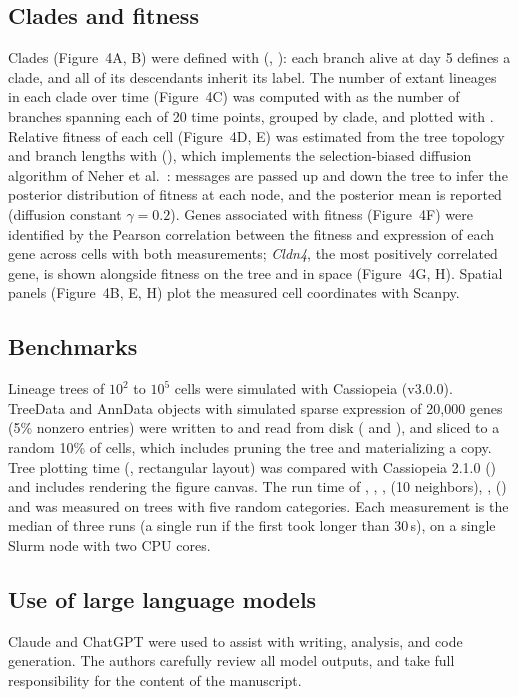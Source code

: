 \subsection*{Clades and fitness}
Clades (Figure~4A, B) were defined with  (, ): each branch alive at day 5 defines a clade, and all of its descendants inherit its label. The number of extant lineages in each clade over time (Figure~4C) was computed with  as the number of branches spanning each of 20 time points, grouped by clade, and plotted with . Relative fitness of each cell (Figure~4D, E) was estimated from the tree topology and branch lengths with  (), which implements the selection-biased diffusion algorithm of Neher et al.~\cite{neher2014}: messages are passed up and down the tree to infer the posterior distribution of fitness at each node, and the posterior mean is reported (diffusion constant $\gamma = 0.2$). Genes associated with fitness (Figure~4F) were identified by the Pearson correlation between the fitness and expression of each gene across cells with both measurements; \textit{Cldn4}, the most positively correlated gene, is shown alongside fitness on the tree and in space (Figure~4G, H). Spatial panels (Figure~4B, E, H) plot the measured cell coordinates with Scanpy.

\subsection*{Benchmarks}
Lineage trees of $10^2$ to $10^5$ cells were simulated with Cassiopeia (v3.0.0). TreeData and AnnData objects with simulated sparse expression of 20,000 genes (5\% nonzero entries) were written to and read from disk ( and ), and sliced to a random 10\% of cells, which includes pruning the tree and materializing a copy. Tree plotting time (, rectangular layout) was compared with Cassiopeia 2.1.0 () and includes rendering the figure canvas. The run time of , , ,  (10 neighbors), ,  () and  was measured on trees with five random categories. Each measurement is the median of three runs (a single run if the first took longer than 30\,s), on a single Slurm node with two CPU cores.

\subsection*{Use of large language models}
Claude and ChatGPT were used to assist with writing, analysis, and code generation. The authors carefully review all model outputs, and take full responsibility for the content of the manuscript.
